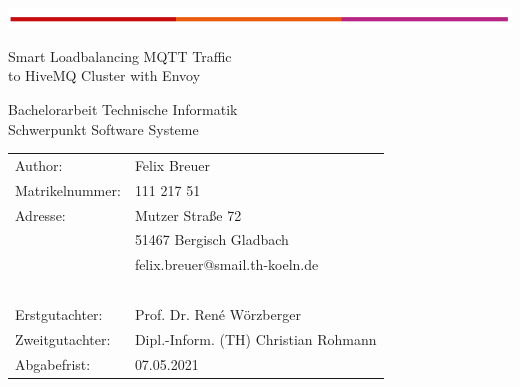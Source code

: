 \begin{titlepage}
\begin{flushleft}
	\vspace*{-1cm}
	\includegraphics[scale=1]{images/th-bar.png}\\
	\vspace*{1cm}
\end{flushleft}
\begin{center}
\begin{huge}
Smart Loadbalancing MQTT Traffic\\
to HiveMQ Cluster with Envoy\\
\end{huge}
\vspace{2cm}
Bachelorarbeit Technische Informatik\\
Schwerpunkt Software Systeme
\end{center}
\vspace{4cm}
\noindent\begin{tabular}{p{5cm}l}
	Author: & Felix Breuer \\
	Matrikelnummer: &	111 217 51 \\
	Adresse: & Mutzer Stra{\ss}e 72 \\
	~ &	51467 Bergisch Gladbach \\
	~ &	felix.breuer@smail.th-koeln.de \\
	~ & ~ \\
	Erstgutachter: & Prof. Dr. René Wörzberger \\
	Zweitgutachter: & Dipl.-Inform. (TH) Christian Rohmann \\
	Abgabefrist: & 07.05.2021 \\
\end{tabular}
~\\
~\\
~\\
~\\
~\\
~\\
\end{titlepage}
\newpage
